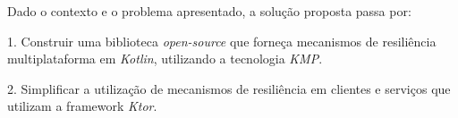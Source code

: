 Dado o contexto e o problema apresentado, a solução proposta passa por:

1.
Construir uma biblioteca \textit{open-source} que forneça mecanismos de resiliência multiplataforma em \textit{Kotlin}, utilizando a tecnologia \textit{KMP}.

2.
Simplificar a utilização de mecanismos de resiliência em clientes e serviços que utilizam a framework \textit{Ktor}.